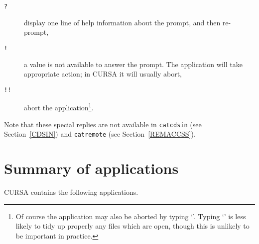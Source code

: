 \documentclass[twoside,11pt]{article}
\newcommand{\xlabel}[1]{}
\renewcommand{\_}{\texttt{\symbol{95}}}
\begin{document}
\begin{description}

  \item[ {\tt ?} ] display one line of help information about the
   prompt, and then re-prompt,

  \item[ {\tt !} ] a value is not available to answer the prompt. The
   application will take appropriate action; in CURSA it will usually
   abort,

  \item[ {\tt !!} ] abort the application\footnote{Of course the
   application may also be aborted by typing `{\tt <Control-C>}'.
   Typing `{\tt <Control-C>}' is less likely to tidy up properly any files
   which are open, though this is unlikely to be important in
   practice.}.

\end{description}

Note that these special replies are not available in {\tt catcdsin}
(see Section~\ref{CDSIN}) and {\tt catremote} (see Section~\ref{REMACCSS}).


\section{\xlabel{SUMMARY}Summary of applications}

CURSA contains the following applications.
\end{document}
